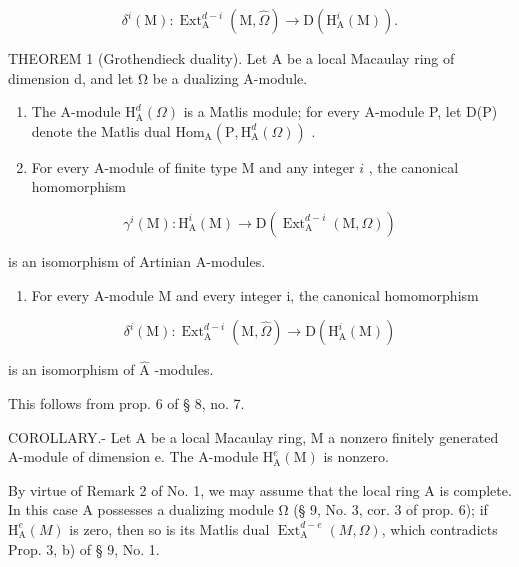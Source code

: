 \[
\delta^ {i} (\mathrm{M}): \operatorname{Ext} _ {\mathrm{A}} ^ {d - i} (\mathrm{M}, \widehat {\Omega}) \longrightarrow \mathrm{D} \left(\mathrm{H} _ {\mathrm{A}} ^ {i} (\mathrm{M})\right).
\]

THEOREM 1 (Grothendieck duality). Let A be a local Macaulay ring of dimension d, and let Ω be a dualizing A-module.

\begin{enumerate}
\def\labelenumi{\alph{enumi})}
\item
  The A-module \(\mathrm{H}_{\mathrm{A}}^{d}(\Omega)\) is a Matlis module; for every A-module P, let D(P) denote the Matlis dual \(\mathrm{Hom}_{\mathrm{A}}(\mathrm{P},\mathrm{H}_{\mathrm{A}}^{d}(\Omega))\) .
\item
  For every \(\mathrm{A}\)-module of finite type M and any integer \(i\) , the canonical homomorphism
\end{enumerate}

\[
\gamma^ {i} (\mathrm{M}): \mathrm{H} _ {\mathrm{A}} ^ {i} (\mathrm{M}) \longrightarrow \mathrm{D} \left(\operatorname{Ext} _ {\mathrm{A}} ^ {d - i} (\mathrm{M}, \Omega)\right)
\]

is an isomorphism of Artinian A-modules.

\begin{enumerate}
\def\labelenumi{\alph{enumi})}
\setcounter{enumi}{2}
\tightlist
\item
  For every A-module M and every integer i, the canonical homomorphism
\end{enumerate}

\[
\delta^ {i} (\mathrm{M}): \operatorname{Ext} _ {\mathrm{A}} ^ {d - i} (\mathrm{M}, \widehat {\Omega}) \longrightarrow \mathrm{D} \left(\mathrm{H} _ {\mathrm{A}} ^ {i} (\mathrm{M})\right)
\]

is an isomorphism of \(\widehat{\mathrm{A}}\) -modules.

This follows from prop. 6 of § 8, no. 7.

COROLLARY.- Let A be a local Macaulay ring, M a nonzero finitely generated A-module of dimension e. The A-module \(\mathrm{H}_{\mathrm{A}}^{e}(\mathrm{M})\) is nonzero.

By virtue of Remark 2 of No. 1, we may assume that the local ring A is complete. In this case A possesses a dualizing module Ω (§ 9, No. 3, cor. 3 of prop. 6); if \(\mathrm{H}_{\mathrm{A}}^{e}(M)\) is zero, then so is its Matlis dual \(\operatorname{Ext}_{\mathrm{A}}^{d-e}(M, \Omega)\), which contradicts Prop. 3, b) of § 9, No. 1.

